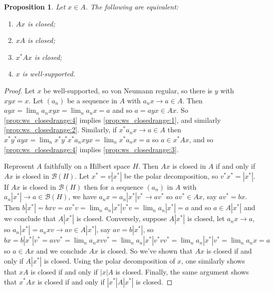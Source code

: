 \documentclass[twoside,a4paper,12pt]{article}
\theoremstyle{plain}
\newtheorem{proposition}{Proposition}[section]
\theoremstyle{definition}
\newcommand{\mc}{\mathcal}
\begin{document}
\begin{proposition}\label{prop:ws_closedrange}
Let $x\in A$.  The following are equivalent:
\begin{enumerate}[(1)]
   \item\label{prop:ws_closedrange:1}
   $Ax$ is closed;
   \item\label{prop:ws_closedrange:2}
   $xA$ is closed;
   \item\label{prop:ws_closedrange:3}
   $x^*Ax$ is closed;
   \item\label{prop:ws_closedrange:4}
   $x$ is well-supported.
\end{enumerate}
\end{proposition}
\begin{proof}
Let $x$ be well-supported, so von Neumann regular, so there is $y$ with $xyx=x$.  Let $(a_n)$ be a sequence in $A$ with $a_n x\to a\in A$.  Then $ayx = \lim_n a_n x yx = \lim_n a_n x =a$ and so $a = ayx \in Ax$.  So \ref{prop:ws_closedrange:4} implies \ref{prop:ws_closedrange:1}, and similarly \ref{prop:ws_closedrange:2}.  Similarly, if $x^*a_nx \to a\in A$ then $x^*y^* a yx = \lim_n x^*y^* x^* a_n x yx = \lim_n x^* a_n x = a$ so $a\in x^*Ax$, and so \ref{prop:ws_closedrange:4} implies \ref{prop:ws_closedrange:3}.

Represent $A$ faithfully on a Hilbert space $H$.  Then $Ax$ is closed in $A$ if and only if $Ax$ is closed in $\mc B(H)$.  Let $x^* = v|x^*|$ be the polar decomposition, so $v^*x^* = |x^*|$.  If $Ax$ is closed in $\mc B(H)$ then for a sequence $(a_n)$ in $A$ with $a_n |x^*| \to a\in\mc B(H)$, we have $a_nx = a_n |x^*|v^* \to av^*$ so $av^*\in Ax$, say $av^*=bx$.  Then $b|x^*| = bxv = av^*v = \lim_n a_n |x^*| v^*v = \lim_n a_n |x^*| = a$ and so $a \in A|x^*|$ and we conclude that $A|x^*|$ is closed.  Conversely, suppose $A|x^*|$ is closed, let $a_nx \to a$, so $a_n|x^*| = a_n xv \to av \in A|x^*|$, say $av = b|x^*|$, so $bx = b|x^*|v^* = avv^* = \lim_n a_n xvv^* = \lim_n a_n |x^*| v^*vv^* = \lim_n a_n |x^*| v^* = \lim_n a_n x = a$ so $a\in Ax$ and we conclude $Ax$ is closed.  So we've shown that $Ax$ is closed if and only if $A|x^*|$ is closed.  Using the polar decomposition of $x$, one similarly shows that $xA$ is closed if and only if $|x|A$ is closed.  Finally, the same argument shows that $x^*Ax$ is closed if and only if $|x^*| A |x^*|$ is closed.


\end{proof}
\end{document}

